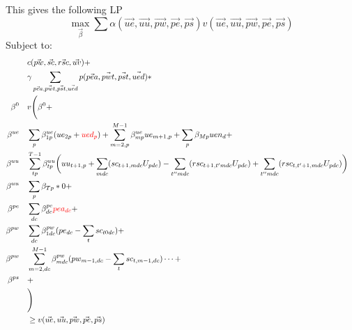 \documentclass{article}
\begin{document}
This gives the following LP
\begin{equation}
	\max_{\vec{\beta}} \sum \alpha (\vec{ue}, \vec{uu}, \vec{pw}, \vec{pe}, \vec{ps}) v(\vec{ue}, \vec{uu}, \vec{pw}, \vec{pe}, \vec{ps})
\end{equation}
Subject to:
\begin{align*}
	& c(\vec{pw}, \vec{sc}, \vec{rsc}, \vec{uv}) +  & \\
	& \gamma \sum_{\vec{pea}, \vec{pwt}, \vec{pst}, \vec{ued}} p(\vec{pea}, \vec{pwt}, \vec{pst}, \vec{ued})  * &  \\
		\beta^{0} \quad & v \Bigg( \beta^{0} + \\
		\beta^{ue} \quad & \sum_{p} \beta_{1p}^{ue} (ue_{2p} + {\color{red} ued_{p}}) + \sum_{m=2,p}^{M-1} \beta_{mp}^{ue} ue_{m+1,p} + \sum_{p} \beta_{Mp} uen_{d} + \\
		\beta^{uu} \quad & \sum_{tp}^{T-1} \beta_{tp}^{uu} \bigg( uu_{t+1,p} + \sum_{mdc} (sc_{t+1,mdc}U_{pdc})  - \sum_{t''mdc} (rsc_{t+1,t'mdc} U_{pdc}) + \sum_{t''mdc} (rsc_{t,t'+1,mdc} U_{pdc}) \bigg) \\
		\beta^{uu} \quad & \sum_{p} \beta_{Tp} * 0 + \\
		\beta^{pe} \quad & \sum_{dc} \beta_{dc}^{pe} {\color{red} pea_{dc}}+ \\
		\beta^{pw} \quad & \sum_{dc} \beta_{1dc}^{pw} (pe_{dc} - \sum_{t} sc_{t0dc}) + \\
		\beta^{pw} \quad & \sum_{m=2,dc}^{M-1} \beta_{mdc}^{pw} (pw_{m-1,dc} - \sum_{t} sc_{t,m-1,dc}) \dots + \\
		\beta^{ps} \quad & + \\
		& \Bigg) \\
	& \ge v(\vec{ue}, \vec{uu}, \vec{pw}, \vec{pe}, \vec{ps})
\end{align*}
\end{document}
